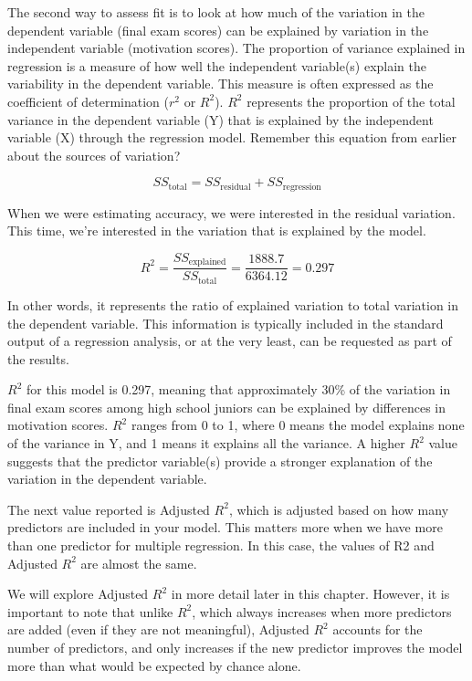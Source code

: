 \documentclass[
  letterpaper,
  DIV=11,
  numbers=noendperiod]{scrreprt}
\begin{document}
The second way to assess fit is to look at how much of the variation in
the dependent variable (final exam scores) can be explained by variation
in the independent variable (motivation scores). The proportion of
variance explained in regression is a measure of how well the
independent variable(s) explain the variability in the dependent
variable. This measure is often expressed as the coefficient of
determination (\(r^2\) or \(R^2\)). \(R^2\) represents the proportion of
the total variance in the dependent variable (Y) that is explained by
the independent variable (X) through the regression model. Remember this
equation from earlier about the sources of variation?

\[
SS_{\text{total}} = SS_{\text{residual}} + SS_{\text{regression}}
\]

When we were estimating accuracy, we were interested in the residual
variation. This time, we're interested in the variation that is
explained by the model.

\[
R^2 = \frac{SS_{\text{explained}}}{SS_{\text{total}}}
= \frac{1888.7}{6364.12} = 0.297
\]

In other words, it represents the ratio of explained variation to total
variation in the dependent variable. This information is typically
included in the standard output of a regression analysis, or at the very
least, can be requested as part of the results.

\(R^2\) for this model is 0.297, meaning that approximately 30\% of the
variation in final exam scores among high school juniors can be
explained by differences in motivation scores. \(R^2\) ranges from 0 to
1, where 0 means the model explains none of the variance in Y, and 1
means it explains all the variance. A higher \(R^2\) value suggests that
the predictor variable(s) provide a stronger explanation of the
variation in the dependent variable.

The next value reported is Adjusted \(R^2\), which is adjusted based on
how many predictors are included in your model. This matters more when
we have more than one predictor for multiple regression. In this case,
the values of R2 and Adjusted \(R^2\) are almost the same.

We will explore Adjusted \(R^2\) in more detail later in this chapter.
However, it is important to note that unlike \(R^2\), which always
increases when more predictors are added (even if they are not
meaningful), Adjusted \(R^2\) accounts for the number of predictors, and
only increases if the new predictor improves the model more than what
would be expected by chance alone.
\end{document}
